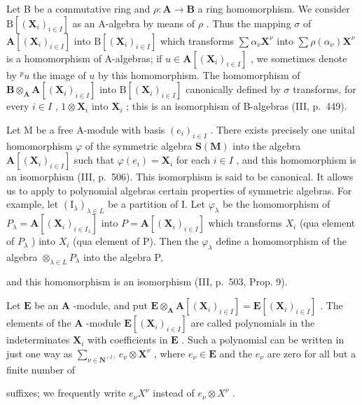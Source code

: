 Let B be a commutative ring and \(\rho: \mathbf{A} \to \mathbf{B}\) a ring homomorphism. We consider \(\mathrm{B}[(\mathbf{X}_i)_{i \in I}]\) as an A-algebra by means of \(\rho\) . Thus the mapping \(\sigma\) of \(\mathbf{A}[(\mathbf{X}_i)_{i \in I}]\) into \(\mathrm{B}[(\mathbf{X}_i)_{i \in I}]\) which transforms \(\sum \alpha_\nu \mathbf{X}^\nu\) into \(\sum \rho(\alpha_\nu) \mathbf{X}^\nu\) is a homomorphism of A-algebras; if \(u \in \mathbf{A}[(\mathbf{X}_i)_{i \in I}]\) , we sometimes denote by \(^p u\) the image of \(u\) by this homomorphism. The homomorphism of \(\mathbf{B} \otimes_{\mathbf{A}} \mathbf{A}[(\mathbf{X}_i)_{i \in I}]\) into \(\mathrm{B}[(\mathbf{X}_i)_{i \in I}]\) canonically defined by \(\sigma\) transforms, for every \(i \in I\) , \(1 \otimes \mathbf{X}_i\) into \(\mathbf{X}_i\) ; this is an isomorphism of B-algebras (III, p.~449).

Let M be a free A-module with basis \((e_{i})_{i\in I}\) . There exists precisely one unital homomorphism \(\varphi\) of the symmetric algebra \(\mathbf{S}(\mathbf{M})\) into the algebra \(\mathbf{A}[(\mathbf{X}_{i})_{i\in I}]\) such that \(\varphi(e_{i})=\mathbf{X}_{i}\) for each \(i\in I\) , and this homomorphism is an isomorphism (III, p.~506). This isomorphism is said to be canonical. It allows us to apply to polynomial algebras certain properties of symmetric algebras. For example, let \((\mathrm{I}_{\lambda})_{\lambda\in L}\) be a partition of I. Let \(\varphi_{\lambda}\) be the homomorphism of \(P_{\lambda}=\mathbf{A}[(\mathbf{X}_{i})_{i\in I_{\lambda}}]\) into \(P=\mathbf{A}[(\mathbf{X}_{i})_{i\in I}]\) which transforms \(X_{i}\) (qua element of \(P_{\lambda}\) ) into \(X_{i}\) (qua element of P). Then the \(\varphi_{\lambda}\) define a homomorphism of the algebra \(\otimes_{\lambda\in L}P_{\lambda}\) into the algebra P,

and this homomorphism is an isomorphism (III, p.~503, Prop. 9).

Let \(\mathbf{E}\) be an \(\mathbf{A}\) -module, and put \(\mathbf{E} \otimes_{\mathbf{A}} \mathbf{A}[(\mathbf{X}_i)_{i \in I}] = \mathbf{E}[(\mathbf{X}_i)_{i \in I}]\) . The elements of the \(\mathbf{A}\) -module \(\mathbf{E}[(\mathbf{X}_i)_{i \in I}]\) are called polynomials in the indeterminates \(\mathbf{X}_i\) with coefficients in \(\mathbf{E}\) . Such a polynomial can be written in just one way as \(\sum_{\nu \in \mathbf{N}^{(I)}} e_\nu \otimes \mathbf{X}^\nu\) , where \(e_\nu \in \mathbf{E}\) and the \(e_\nu\) are zero for all but a finite number of

suffixes; we frequently write \(e_{\nu}X^{\nu}\) instead of \(e_{\nu}\otimes X^{\nu}\) .


